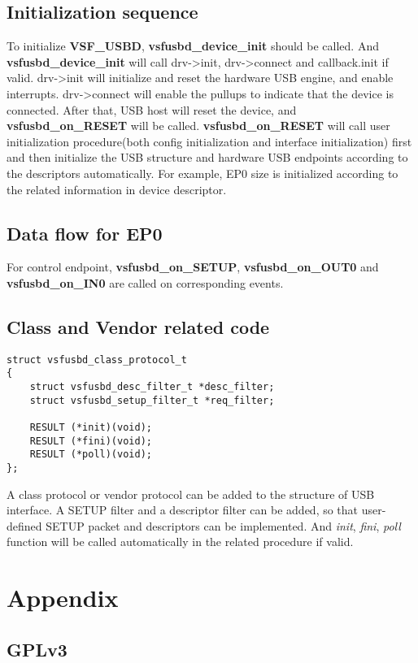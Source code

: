 \documentclass[a4paper,12pt]{book}
\begin{document}
\newpage
\section{Initialization sequence}
To initialize \textbf{VSF\_USBD}, \textbf{vsfusbd\_device\_init} should be called. And \textbf{vsfusbd\_device\_init} will call drv->init, drv->connect and callback.init if valid. drv->init will initialize and reset the hardware USB engine, and enable interrupts. drv->connect will enable the pullups to indicate that the device is connected. After that, USB host will reset the device, and \textbf{vsfusbd\_on\_RESET} will be called. \textbf{vsfusbd\_on\_RESET} will call user initialization procedure(both config initialization and interface initialization) first and then initialize the USB structure and hardware USB endpoints according to the descriptors automatically. For example, EP0 size is initialized according to the related information in device descriptor.

\newpage
\section{Data flow for EP0}
For control endpoint, \textbf{vsfusbd\_on\_SETUP}, \textbf{vsfusbd\_on\_OUT0} and \textbf{vsfusbd\_on\_IN0} are called on corresponding events.

\newpage
\section{Class and Vendor related code}
\begin{lstlisting}
struct vsfusbd_class_protocol_t
{
	struct vsfusbd_desc_filter_t *desc_filter;
	struct vsfusbd_setup_filter_t *req_filter;
	
	RESULT (*init)(void);
	RESULT (*fini)(void);
	RESULT (*poll)(void);
};
\end{lstlisting}
A class protocol or vendor protocol can be added to the structure of USB interface. A SETUP filter and a descriptor filter can be added, so that user-defined SETUP packet and descriptors can be implemented. And \emph{init}, \emph{fini}, \emph{poll} function will be called automatically in the related procedure if valid.

\chapter{Appendix}
\minitoc

\newpage
\section{GPLv3}
\end{document}
